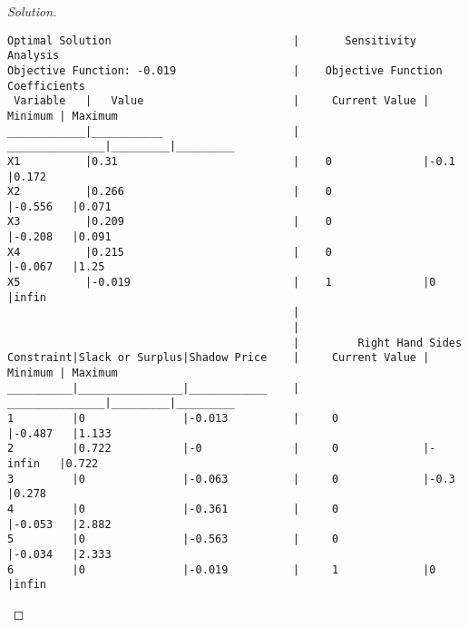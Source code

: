 \documentclass[titlepage, letterpaper, fleqn]{article}
\renewcommand\qedsymbol{\(\blacksquare\)}
\newenvironment{solution}
{\renewcommand\qedsymbol{$\square$}\begin{proof}[Solution]}
{\end{proof}}
\begin{document}
\begin{solution}
\begin{lstlisting}[basicstyle=\tiny]
Optimal Solution                            |       Sensitivity Analysis
Objective Function: -0.019                  |    Objective Function Coefficients
 Variable   |   Value                       |     Current Value | Minimum | Maximum 
____________|___________                    |    _______________|_________|_________
X1          |0.31                           |    0              |-0.1     |0.172
X2          |0.266                          |    0              |-0.556   |0.071
X3          |0.209                          |    0              |-0.208   |0.091
X4          |0.215                          |    0              |-0.067   |1.25
X5          |-0.019                         |    1              |0        |infin
                                            |
                                            |
                                            |         Right Hand Sides
Constraint|Slack or Surplus|Shadow Price    |     Current Value | Minimum | Maximum 
__________|________________|____________    |    _______________|_________|_________
1         |0               |-0.013          |     0             |-0.487   |1.133
2         |0.722           |-0              |     0             |-infin   |0.722
3         |0               |-0.063          |     0             |-0.3     |0.278
4         |0               |-0.361          |     0             |-0.053   |2.882
5         |0               |-0.563          |     0             |-0.034   |2.333
6         |0               |-0.019          |     1             |0        |infin

\end{lstlisting}
\end{solution}
\end{document}
